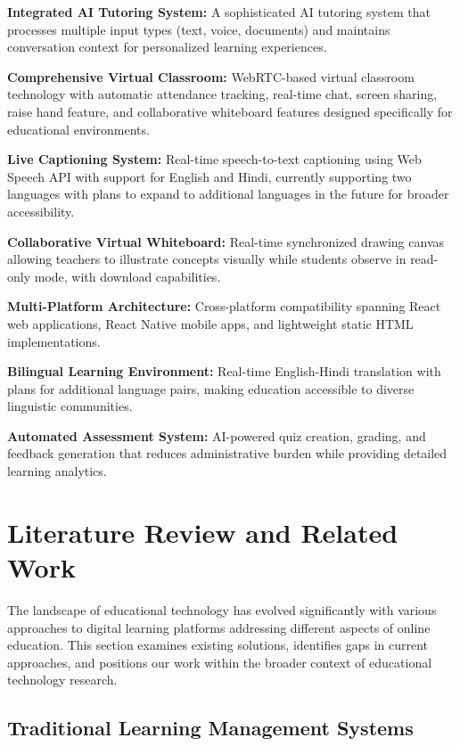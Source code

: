 \documentclass[onecolumn]{IEEEtran}
\begin{document}
\textbf{Integrated AI Tutoring System:} A sophisticated AI tutoring system that processes multiple input types (text, voice, documents) and maintains conversation context for personalized learning experiences.

\textbf{Comprehensive Virtual Classroom:} WebRTC-based virtual classroom technology with automatic attendance tracking, real-time chat, screen sharing, raise hand feature, and collaborative whiteboard features designed specifically for educational environments.

\textbf{Live Captioning System:} Real-time speech-to-text captioning using Web Speech API with support for English and Hindi, currently supporting two languages with plans to expand to additional languages in the future for broader accessibility.

\textbf{Collaborative Virtual Whiteboard:} Real-time synchronized drawing canvas allowing teachers to illustrate concepts visually while students observe in read-only mode, with download capabilities.

\textbf{Multi-Platform Architecture:} Cross-platform compatibility spanning React web applications, React Native mobile apps, and lightweight static HTML implementations.

\textbf{Bilingual Learning Environment:} Real-time English-Hindi translation with plans for additional language pairs, making education accessible to diverse linguistic communities.

\textbf{Automated Assessment System:} AI-powered quiz creation, grading, and feedback generation that reduces administrative burden while providing detailed learning analytics.

\section{Literature Review and Related Work}

The landscape of educational technology has evolved significantly with various approaches to digital learning platforms addressing different aspects of online education. This section examines existing solutions, identifies gaps in current approaches, and positions our work within the broader context of educational technology research.

\subsection{Traditional Learning Management Systems}
\end{document}
